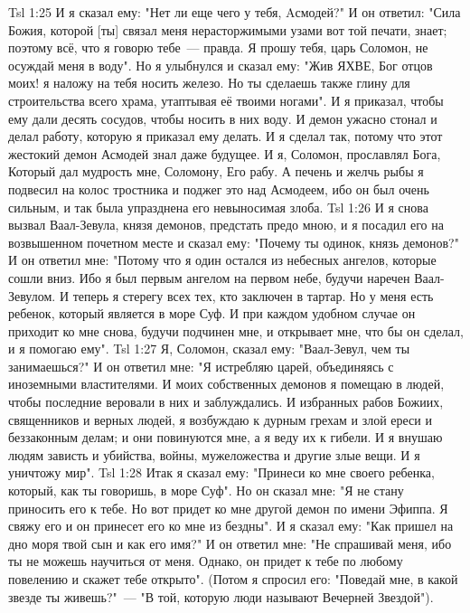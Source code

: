 \vs Tsl 1:25 
И я сказал ему: "Нет ли еще чего у тебя, Aсмодей?" И он ответил: "Сила Божия, которой [ты] связал меня нерасторжимыми узами вот той печати, знает; поэтому всё, что я говорю тебе~--- правда. Я прошу тебя, царь Соломон, не осуждай меня в воду". Но я улыбнулся и сказал ему: "Жив ЯХВЕ, Бог отцов моих! я наложу на тебя носить железо. Но ты сделаешь также глину для строительства всего храма, утаптывая её твоими ногами". И я приказал, чтобы ему дали десять сосудов, чтобы носить в них воду. И демон ужасно стонал и делал работу, которую я приказал ему делать. И я сделал так, потому что этот жестокий демон Асмодей знал даже будущее. И я, Соломон, прославлял Бога, Который дал мудрость мне, Соломону, Его рабу. А печень и желчь рыбы я подвесил на колос тростника и поджег это над Асмодеем, ибо он был очень сильным, и так была упразднена его невыносимая злоба.
\vs Tsl 1:26 
И я снова вызвал Ваал-Зевула, князя демонов, предстать предо мною, и я посадил его на возвышенном почетном месте и сказал ему: "Почему ты одинок, князь демонов?" И он ответил мне: "Потому что я один остался из небесных ангелов, которые сошли вниз. Ибо я был первым ангелом на первом небе, будучи наречен Ваал-Зевулом. И теперь я стерегу всех тех, кто заключен в тартар. Но у меня есть ребенок, который является в море Суф. И при каждом удобном случае он приходит ко мне снова, будучи подчинен мне, и открывает мне, что бы он сделал, и я помогаю ему".
\vs Tsl 1:27 
Я, Соломон, сказал ему: "Ваал-Зевул, чем ты занимаешься?" И он ответил мне: "Я истребляю царей, объединяясь с иноземными властителями. И моих собственных демонов я помещаю в людей, чтобы последние веровали в них и заблуждались. И избранных рабов Божиих, священников и верных людей, я возбуждаю к дурным грехам и злой ереси и беззаконным делам; и они повинуются мне, а я веду их к гибели. И я внушаю людям зависть и убийства, войны, мужеложества и другие злые вещи. И я уничтожу мир".
\vs Tsl 1:28 
Итак я сказал ему: "Принеси ко мне своего ребенка, который, как ты говоришь, в море Суф". Но он сказал мне: "Я не стану приносить его к тебе. Но вот придет ко мне другой демон по имени Эфиппа. Я свяжу его и он принесет его ко мне из бездны". И я сказал ему: "Как пришел на дно моря твой сын и как его имя?" И он ответил мне: "Не спрашивай меня, ибо ты не можешь научиться от меня. Однако, он придет к тебе по любому повелению и скажет тебе открыто". (Потом я спросил его: "Поведай мне, в какой звезде ты живешь?"~--- "В той, которую люди называют Вечерней Звездой").
